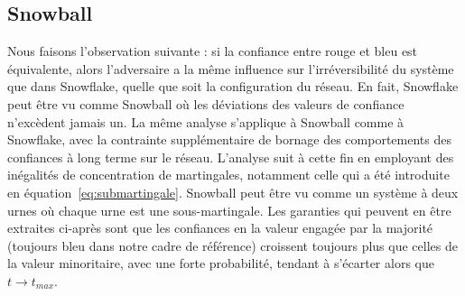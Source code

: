 \documentclass[a4,twocolumn,10pt]{article}
\theoremstyle{definition}
\begin{document}
\begin{appendices}
\subsection{Snowball}
Nous faisons l'observation suivante : si la confiance entre rouge et bleu est équivalente, alors l'adversaire a la même influence sur l'irréversibilité du système que dans Snowflake, quelle que soit la configuration du réseau. En fait, Snowflake peut être vu comme Snowball où les déviations des valeurs de confiance n'excèdent jamais un. La même analyse s'applique à Snowball comme à Snowflake, avec la contrainte supplémentaire de bornage des comportements des confiances à long terme sur le réseau. L'analyse suit à cette fin en employant des inégalités de concentration de martingales, notamment celle qui a été introduite en équation~\ref{eq:submartingale}. Snowball peut être vu comme un système à deux urnes où chaque urne est une sous-martingale. Les garanties qui peuvent en être extraites ci-après sont que les confiances en la valeur engagée par la majorité (toujours bleu dans notre cadre de référence) croissent toujours plus que celles de la valeur minoritaire, avec une forte probabilité, tendant à s'écarter alors que $t \rightarrow t_{max}$.

\end{appendices}
\end{document}
